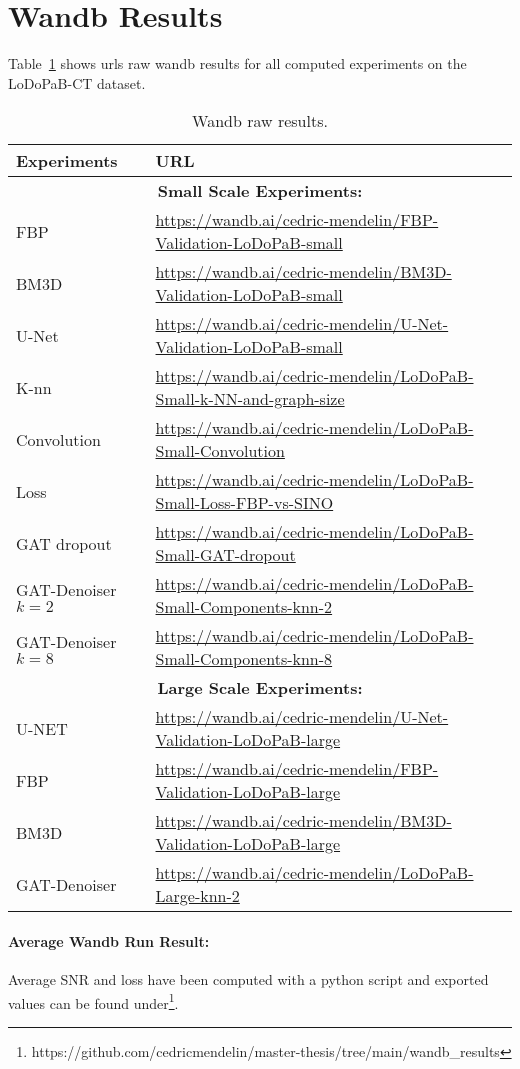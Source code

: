 \section{Wandb Results}
\label{sec:wandb}
Table~\ref{tab:wandb_results} shows urls raw wandb results for all computed experiments on the LoDoPaB-CT dataset.
\begin{table}[H]
  \centering
  \begin{tabular}{l|l}
    \toprule
    \textbf{Experiments} & \textbf{URL} \\ 
    \midrule
    \multicolumn{2}{c}{\textbf{Small Scale Experiments:}} \\
    FBP & \url{https://wandb.ai/cedric-mendelin/FBP-Validation-LoDoPaB-small} \\ \hline
    BM3D & \url{https://wandb.ai/cedric-mendelin/BM3D-Validation-LoDoPaB-small} \\ \hline
    U-Net& \url{https://wandb.ai/cedric-mendelin/U-Net-Validation-LoDoPaB-small} \\ \hline
    K-nn &\url{https://wandb.ai/cedric-mendelin/LoDoPaB-Small-k-NN-and-graph-size} \\ \hline
    Convolution & \url{https://wandb.ai/cedric-mendelin/LoDoPaB-Small-Convolution} \\ \hline
    Loss& \url{https://wandb.ai/cedric-mendelin/LoDoPaB-Small-Loss-FBP-vs-SINO} \\ \hline
    GAT dropout& \url{https://wandb.ai/cedric-mendelin/LoDoPaB-Small-GAT-dropout} \\ \hline
    GAT-Denoiser $k=2$ & \url{https://wandb.ai/cedric-mendelin/LoDoPaB-Small-Components-knn-2} \\ \hline
    GAT-Denoiser $k=8$ & \url{https://wandb.ai/cedric-mendelin/LoDoPaB-Small-Components-knn-8} \\ \hline
    \midrule
    \multicolumn{2}{c}{\textbf{Large Scale Experiments:}} \\
    U-NET & \url{https://wandb.ai/cedric-mendelin/U-Net-Validation-LoDoPaB-large} \\ \hline
    FBP& \url{https://wandb.ai/cedric-mendelin/FBP-Validation-LoDoPaB-large} \\ \hline
    BM3D& \url{https://wandb.ai/cedric-mendelin/BM3D-Validation-LoDoPaB-large} \\ \hline
    GAT-Denoiser & \url{https://wandb.ai/cedric-mendelin/LoDoPaB-Large-knn-2} \\ \hline
    \midrule

  \end{tabular}
  \caption{Wandb raw results.}
  \label{tab:wandb_results}
\end{table}

\paragraph{Average Wandb Run Result:}
Average SNR and loss have been computed with a python script and exported values can be found under\footnote{https://github.com/cedricmendelin/master-thesis/tree/main/wandb\_results}.
